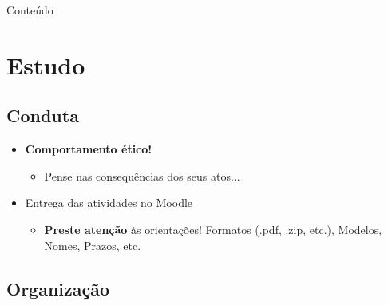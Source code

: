 \begin{frame}{Conteúdo}
    \begin{multicols}{2}
    	\tableofcontents[sections=1]%
    	\columnbreak
    	\tableofcontents[sections=2-]
    	\vfill\null
    \end{multicols}
\end{frame}

\section{Estudo} %

\subsection{Conduta} %

\begin{frame}{\insertsubsection} 
	\begin{itemize}
	    \item \textbf{Comportamento ético! }
	    \begin{itemize}
	        \item Pense nas consequências dos seus atos... 
		\end{itemize}
		\item Entrega das atividades no Moodle
		\begin{itemize}
			\item \textbf{Preste atenção} às orientações! Formatos (.pdf, .zip, etc.), Modelos, Nomes, Prazos, etc. 
		\end{itemize}
	\end{itemize}
\end{frame}

\subsection{Organização} %

